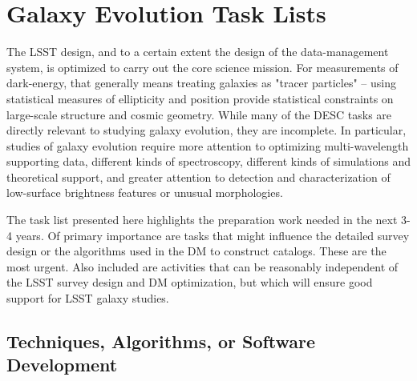 

\section{Galaxy Evolution Task Lists}\label{sec:tasks:gal:intro}  

The LSST design, and to a certain extent the design of the data-management
system, is optimized to carry out the core science mission. For measurements
of dark-energy, that generally means treating galaxies as "tracer particles" --
using statistical measures of ellipticity and position provide statistical
constraints on large-scale structure and cosmic geometry. While many of the
DESC tasks are directly relevant to studying galaxy evolution, they are 
incomplete. In particular, studies of galaxy evolution require more attention to 
optimizing multi-wavelength supporting data, different kinds of spectroscopy, different
kinds of simulations and theoretical support, and greater attention to detection
and characterization of low-surface brightness features or unusual morphologies.

The task list presented here highlights the preparation work needed in the next 3-4
years. Of primary importance are tasks that might influence the detailed survey
design or the algorithms used in the DM to construct catalogs. These are the most
urgent. Also included are activities that can be reasonably independent of the
LSST survey design and DM optimization, but which will ensure good support for
LSST galaxy studies.  

\subsection{Techniques, Algorithms, or Software Development} \label{sec:tasks:gal:precursor}

